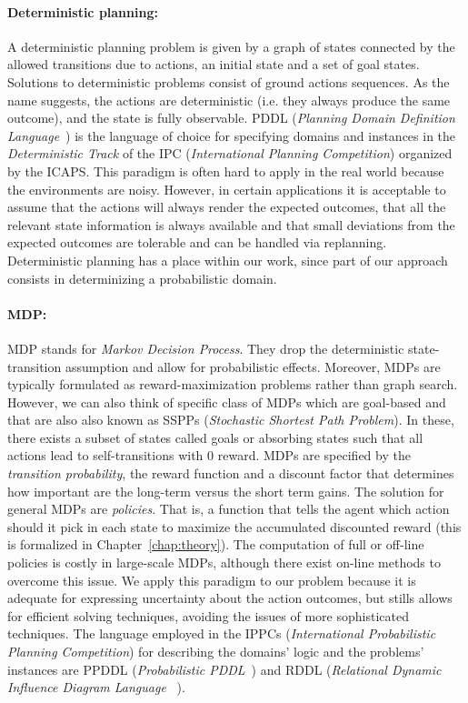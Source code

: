 \documentclass[../root.tex]{subfiles}
\begin{document}
\paragraph{Deterministic planning:} A deterministic planning problem
is given by a graph of states connected by the allowed transitions due
to actions, an initial state and a set
of goal states. Solutions to deterministic problems
consist of ground actions sequences. As the name suggests,
the actions are deterministic (i.e.
they always produce the same outcome), and the state is fully
observable.
PDDL (\emph{Planning Domain Definition Language}~\cite{fox2003pddl2})
is the language of choice for specifying domains and instances in
the \emph{Deterministic Track} of the
IPC (\emph{International Planning Competition}) organized by the
ICAPS. This paradigm is often hard to apply in
the real world because the environments are noisy.
However, in certain applications it is acceptable to assume
that the actions will always render the expected outcomes,
that all the relevant state information is always available and
that small deviations from the expected outcomes are tolerable
and can be handled via replanning. Deterministic planning
has a place within our work, since part of our approach consists
in determinizing a probabilistic domain.

\paragraph{MDP:} MDP stands for \emph{Markov Decision Process}. They
drop the deterministic state-transition assumption and allow for
probabilistic effects. Moreover, MDPs are typically formulated as
reward-maximization problems rather than graph search. However,
we can also think of specific class of MDPs which are goal-based
and that are also also known as SSPPs (\emph{Stochastic Shortest
Path Problem}). In these, there exists a subset of states called
goals or absorbing states such that all actions lead to self-transitions
with 0 reward. MDPs are specified by the \emph{transition
probability}, the reward function and a discount factor that determines
how important are the long-term versus the short term gains.
The solution for general MDPs are \emph{policies}. That is,
a function that tells the agent which action should it
pick in each state to maximize the accumulated discounted reward
(this is formalized in Chapter~\ref{chap:theory}). The computation of
full or off-line policies is costly in large-scale MDPs,
although there exist on-line methods to overcome this issue.
We apply this paradigm to our problem because it is adequate
for expressing uncertainty about the action outcomes, but stills allows for
efficient solving techniques, avoiding the issues of more sophisticated
techniques. The language
employed in the IPPCs (\emph{International Probabilistic Planning %
Competition}) for describing the domains' logic and the problems'
instances are PPDDL (\emph{Probabilistic PDDL}~\cite{younes2004ppddl1})
and RDDL (\emph{Relational Dynamic Influence Diagram Language}~%
\cite{sanner2010relational}).
\end{document}
